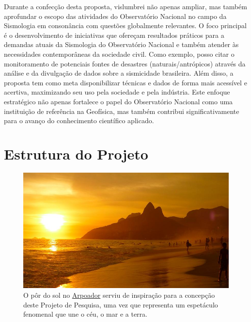 \documentclass[10pt,a4paper,oneside]{book}
\newcommand{\HeroFigPad}{\vspace{-1cm}}
\begin{document}
\bigskip	

Durante a confecção desta proposta, vislumbrei não apenas ampliar, mas também aprofundar o escopo das atividades do Observatório Nacional no campo da Sismologia em consonância com questões globalmente relevantes. O foco principal é o desenvolvimento de iniciativas que ofereçam resultados práticos para a demandas atuais da Sismologia do Observatório Nacional e também atender às necessidades contemporâneas da sociedade civil. Como exemplo, posso citar o monitoramento de potenciais fontes de desastres (naturais/antrópicos) através da análise e da divulgação de dados sobre a sismicidade brasileira. Além disso, a proposta tem como meta disponibilizar técnicas e dados de forma mais acessível e acertiva, maximizando seu uso pela sociedade e pela indústria. Este enfoque estratégico não apenas fortalece o papel do Observatório Nacional como uma instituição de referência na Geofísica, mas também contribui significativamente para o avanço do conhecimento científico aplicado.


\chapter{Estrutura do Projeto}
\label{cap_estrutura}

\begin{figure}[h]
	\HeroFigPad
	\begin{center}
		\includegraphics[width=\textwidth]{images/arpoador.jpg}
	\end{center}
	\caption{
	O pôr do sol no \href{https://pt.wikipedia.org/wiki/Arpoador}{Arpoador} serviu de inspiração para a concepção deste Projeto de Pesquisa, uma vez que representa um espetáculo fenomenal que une o céu, o mar e a terra.
    }
 \label{fig_arpoador}
\end{figure}
\end{document}
